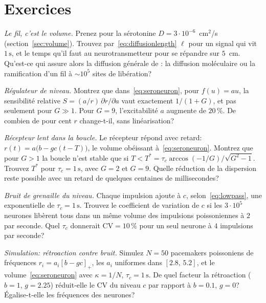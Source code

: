 \section{Exercices}

\begin{exercise}[\lvlA]
\label{ex:05:1}
\emph{Le fil, c'est le volume.} Prenez pour la sérotonine $D=3\cdot10^{-6}$~cm$^2$/s (section~\ref{sec:volume}). Trouvez par~\eqref{eq:diffusionlength} $\ell$ pour un signal qui vit $1\,\text{s}$, et le temps qu'il faut au neurotransmetteur pour se répandre sur $5$~cm. Qu'est-ce qui assure alors la diffusion générale de : la diffusion moléculaire ou la ramification d'un fil à $\sim10^5$ sites de libération?
\end{exercise}

\begin{exercise}[\lvlA]
\label{ex:05:2}
\emph{Régulateur de niveau.} Montrez que dans~\eqref{eq:seroneuron}, pour $f(u)=au$, la sensibilité relative $S=(a/r)\,\partial r/\partial a$ vaut exactement $1/(1+G)$, et pas seulement pour $G\gg1$. Pour $G=9$, l'excitabilité $a$ augmente de $20\,\%$. De combien de pour cent $r$ change-t-il, sans linéarisation?
\end{exercise}

\begin{exercise}[\lvlB]
\label{ex:05:3}
\emph{Récepteur lent dans la boucle.} Le récepteur  répond avec retard: $r(t)=a\bigl(b-gc(t-T)\bigr)$, le volume obéissant à~\eqref{eq:seroneuron}. Montrez que pour $G>1$ la boucle n'est stable que si $T<T^*=\tau_c\arccos(-1/G)/\sqrt{G^2-1}$. Trouvez $T^*$ pour $\tau_c=1\,\text{s}$, avec $G=2$ et $G=9$. Quelle réduction de la dispersion reste possible avec un retard de quelques centaines de millisecondes?
\end{exercise}

\begin{exercise}[\lvlB]
\label{ex:05:4}
\emph{Bruit de grenaille du niveau.} Chaque impulsion ajoute à $c$, selon~\eqref{eq:lowpass}, une exponentielle de $\tau_c=1\,\text{s}$. Trouvez le coefficient de variation de $c$ si les $3\cdot10^5$ neurones  libèrent tous dans un même volume des impulsions poissoniennes à $2$ par seconde. Quel $\tau_c$ donnerait $\mathrm{CV}=10\,\%$ pour un seul neurone à $4$ impulsions par seconde?
\end{exercise}

\begin{exercise}[\lvlB]
\label{ex:05:5}
\emph{Simulation: rétroaction contre bruit.} Simulez $N=50$ pacemakers poissoniens de fréquences $r_i=a_i[b-gc]_+$, les $a_i$ uniformes dans $[2.8,\,5.2]$, et le volume~\eqref{eq:seroneuron} avec $\kappa=1/N$, $\tau_c=1\,\text{s}$. De quel facteur la rétroaction ($b=1$, $g=2.25$) réduit-elle le CV du niveau $c$ par rapport à $b=0.1$, $g=0$? Égalise-t-elle les fréquences des neurones?
\end{exercise}

